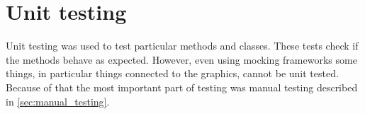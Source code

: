 \section{Unit testing} \label{sec:unit_testing}
Unit testing was used to test particular methods and classes.
These tests check if the methods behave as expected.
However, even using mocking frameworks some things, in particular things connected to the graphics, cannot be unit tested.
Because of that the most important part of testing was manual testing described in \autoref{sec:manual_testing}.